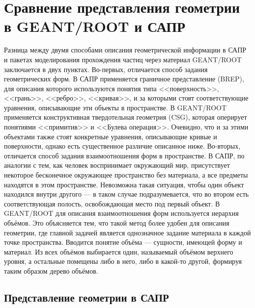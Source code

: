 \section{Сравнение представления геометрии в GEANT/ROOT и САПР}\label{sec:ROOTvsCAD}

Разница между двумя способами описания геометрической информации в САПР и пакетах моделирования прохождения частиц через материал GEANT/ROOT заключается в двух пунктах. Во-первых, отличается способ задания геометрических форм. В САПР применяется граничное представление (BREP), для описания которого используются понятия типа <<поверхность>>, <<грань>>, <<ребро>>, <<кривая>>, и за которыми стоят соответствующие уравнения, описывающие эти объекты в пространстве. В GEANT/ROOT применяется конструктивная твердотельная геометрия (CSG), которая оперирует понятиями <<примитив>> и <<Булева операция>>. Очевидно, что и за этими объектами также стоят конкретные уравнения, описывающие кривые и поверхности, однако есть существенное различие описанное ниже. Во-вторых, отличается способ задания взаимоотношения форм в пространстве. В САПР, по аналогии с тем, как человек воспринимает окружающий мир, присутствует некоторое бесконечное окружающее пространство без материала, а все предметы находятся в этом пространстве. Невозможна такая ситуация, чтобы один объект находился внутри другого --- в таком случае подразумевается, что во втором есть соответствующая полость, освобождающая место под первый объект. В GEANT/ROOT для описания взаимоотношения форм используется иерархия объёмов. Это объясняется тем, что такой метод более удобен для описания геометрии, где главной задачей является однозначное задание материала в каждой точке пространства. Вводится понятие объёма --- сущности, имеющей форму и материал. Из всех объёмов выбирается один, называемый объёмом верхнего уровня, а остальные помещены либо в него, либо в какой-то другой, формируя таким образом дерево объёмов.

\subsection{Представление геометрии в САПР}\label{sec:geoCAD}

